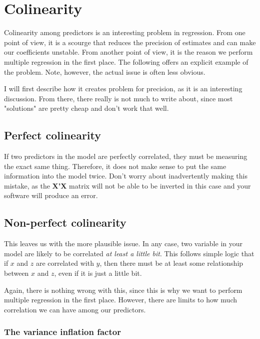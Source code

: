 

\chapter{Colinearity}

Colinearity among predictors is an interesting problem in regression. From one point of view, it is a scourge that reduces the precision of estimates and can make our coefficients unstable. From another point of view, it is the reason we perform multiple regression in the first place. The following offers an explicit example of the problem. Note, however, the actual issue is often less obvious.

I will first describe how it creates problem for precision, as it is an interesting discussion. From there, there really is not much to write about, since most "solutions" are pretty cheap and don't work that well.

\section{Perfect colinearity}

If two predictors in the model are perfectly correlated, they must be measuring the exact same thing. Therefore, it does not make sense to put the same information into the model twice. Don't worry about inadvertently making this mistake, as the {\bf X'X} matrix will not be able to be inverted in this case and your software will produce an error.

\section{Non-perfect colinearity}

This leaves us with the more plausible issue. In any case, two variable in your model are likely to be correlated {\it at least a little bit}. This follows simple logic that if $x$ and $z$ are correlated with $y$, then there must be at least some relationship between $x$ and $z$, even if it is just a little bit.

Again, there is nothing wrong with this, since this is why we want to perform multiple regression in the first place. However, there are limits to how much correlation we can have among our predictors.

\subsection{The variance inflation factor}

